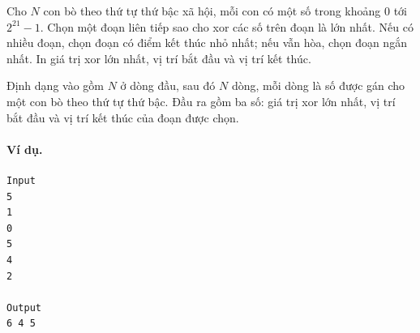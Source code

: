 \documentclass[11pt]{article}
\begin{document}
Cho \(N\) con bò theo thứ tự thứ bậc xã hội, mỗi con có một số trong khoảng
\(0\) tới \(2^{21}-1\). Chọn một đoạn liên tiếp sao cho xor các số trên đoạn
là lớn nhất. Nếu có nhiều đoạn, chọn đoạn có điểm kết thúc nhỏ nhất; nếu vẫn
hòa, chọn đoạn ngắn nhất. In giá trị xor lớn nhất, vị trí bắt đầu và vị trí
kết thúc.

Định dạng vào gồm \(N\) ở dòng đầu, sau đó \(N\) dòng, mỗi dòng là số được
gán cho một con bò theo thứ tự thứ bậc. Đầu ra gồm ba số: giá trị xor lớn
nhất, vị trí bắt đầu và vị trí kết thúc của đoạn được chọn.

\paragraph{Ví dụ.}
\begin{verbatim}
Input
5
1
0
5
4
2

Output
6 4 5
\end{verbatim}
\end{document}
